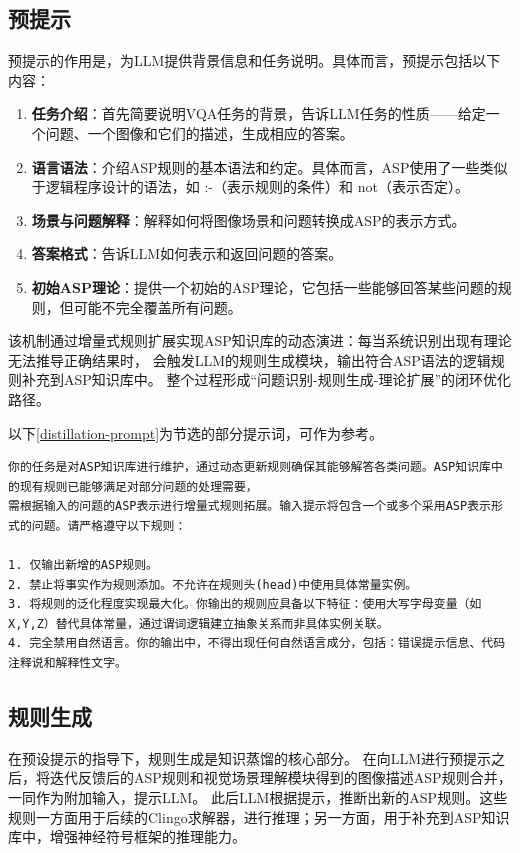 \subsection{预提示}
预提示的作用是，为LLM提供背景信息和任务说明。具体而言，预提示包括以下内容：
\begin{enumerate}[itemsep=0pt,parsep=0pt]
\item \textbf{任务介绍}：首先简要说明VQA任务的背景，告诉LLM任务的性质——给定一个问题、一个图像和它们的描述，生成相应的答案。
\item \textbf{语言语法}：介绍ASP规则的基本语法和约定。具体而言，ASP使用了一些类似于逻辑程序设计的语法，如 :-（表示规则的条件）和 not（表示否定）。
\item \textbf{场景与问题解释}：解释如何将图像场景和问题转换成ASP的表示方式。
\item \textbf{答案格式}：告诉LLM如何表示和返回问题的答案。
\item \textbf{初始ASP理论}：提供一个初始的ASP理论，它包括一些能够回答某些问题的规则，但可能不完全覆盖所有问题。
\end{enumerate}

该机制通过增量式规则扩展实现ASP知识库的动态演进：每当系统识别出现有理论无法推导正确结果时，
会触发LLM的规则生成模块，输出符合ASP语法的逻辑规则补充到ASP知识库中。
整个过程形成“问题识别-规则生成-理论扩展”的闭环优化路径。

以下\ref{distillation-prompt}为节选的部分提示词，可作为参考。
\begin{lstlisting}[label=distillation-prompt]
你的任务是对ASP知识库进行维护，通过动态更新规则确保其能够解答各类问题。ASP知识库中的现有规则已能够满足对部分问题的处理需要，
需根据输入的问题的ASP表示进行增量式规则拓展。输入提示将包含一个或多个采用ASP表示形式的问题。请严格遵守以下规则：

1. 仅输出新增的ASP规则。
2. 禁止将事实作为规则添加。不允许在规则头(head)中使用具体常量实例。
3. 将规则的泛化程度实现最大化。你输出的规则应具备以下特征：使用大写字母变量（如X,Y,Z）替代具体常量，通过谓词逻辑建立抽象关系而非具体实例关联。
4. 完全禁用自然语言。你的输出中，不得出现任何自然语言成分，包括：错误提示信息、代码注释说和解释性文字。
\end{lstlisting}
\subsection{规则生成}
在预设提示的指导下，规则生成是知识蒸馏的核心部分。
在向LLM进行预提示之后，将迭代反馈后的ASP规则和视觉场景理解模块得到的图像描述ASP规则合并，一同作为附加输入，提示LLM。
此后LLM根据提示，推断出新的ASP规则。这些规则一方面用于后续的Clingo求解器，进行推理；另一方面，用于补充到ASP知识库中，增强神经符号框架的推理能力。


